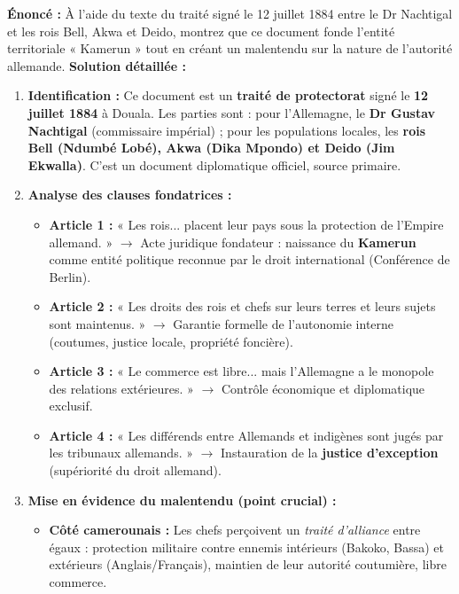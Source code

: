 \documentclass[11pt]{article}
\begin{document}
\begin{exoresolu}
\textbf{Énoncé :} À l'aide du texte du traité signé le 12 juillet 1884 entre le Dr Nachtigal et les rois Bell, Akwa et Deido, montrez que ce document fonde l'entité territoriale « Kamerun » tout en créant un malentendu sur la nature de l'autorité allemande.
\tcblower
\textbf{Solution détaillée :}
\begin{enumerate}
    \item \textbf{Identification :} Ce document est un \textbf{traité de protectorat} signé le \textbf{12 juillet 1884} à Douala. Les parties sont : pour l'Allemagne, le \textbf{Dr Gustav Nachtigal} (commissaire impérial) ; pour les populations locales, les \textbf{rois Bell (Ndumbé Lobé), Akwa (Dika Mpondo) et Deido (Jim Ekwalla)}. C'est un document diplomatique officiel, source primaire.
    \item \textbf{Analyse des clauses fondatrices :}
    \begin{itemize}
        \item \textbf{Article 1 :} « Les rois... placent leur pays sous la protection de l'Empire allemand. » $\rightarrow$ Acte juridique fondateur : naissance du \textbf{Kamerun} comme entité politique reconnue par le droit international (Conférence de Berlin).
        \item \textbf{Article 2 :} « Les droits des rois et chefs sur leurs terres et leurs sujets sont maintenus. » $\rightarrow$ Garantie formelle de l'autonomie interne (coutumes, justice locale, propriété foncière).
        \item \textbf{Article 3 :} « Le commerce est libre... mais l'Allemagne a le monopole des relations extérieures. » $\rightarrow$ Contrôle économique et diplomatique exclusif.
        \item \textbf{Article 4 :} « Les différends entre Allemands et indigènes sont jugés par les tribunaux allemands. » $\rightarrow$ Instauration de la \textbf{justice d'exception} (supériorité du droit allemand).
    \end{itemize}
    \item \textbf{Mise en évidence du malentendu (point crucial) :}
    \begin{itemize}
        \item \textbf{Côté camerounais :} Les chefs perçoivent un \emph{traité d'alliance} entre égaux : protection militaire contre ennemis intérieurs (Bakoko, Bassa) et extérieurs (Anglais/Français), maintien de leur autorité coutumière, libre commerce.

\end{itemize}
\end{enumerate}
\end{exoresolu}
\end{document}
